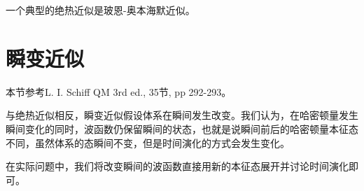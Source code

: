 一个典型的绝热近似是玻恩-奥本海默近似。

\section{瞬变近似}
\begin{framed}
本节参考L. I. Schiff QM 3rd ed., 35节, pp 292-293。
\end{framed}
与绝热近似相反，瞬变近似假设体系在瞬间发生改变。我们认为，在哈密顿量发生瞬间变化的同时，波函数仍保留瞬间的状态，也就是说瞬间前后的哈密顿量本征态不同，虽然体系的态瞬间不变，但是时间演化的方式会发生变化。

在实际问题中，我们将改变瞬间的波函数直接用新的本征态展开并讨论时间演化即可。
